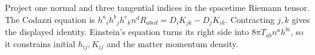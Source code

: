 \begin{enumerate}[leftmargin=2.8em,itemsep=1.2em]
Project one normal and three tangential indices in the spacetime Riemann
tensor.  The Codazzi equation is
\(h^a{}_ih^b{}_jh^c{}_kn^dR_{abcd}=D_iK_{jk}-D_jK_{ik}\).
Contracting \(j,k\) gives the displayed identity.  Einstein's equation turns
its right side into \(8\pi T_{ab}n^ah^{bi}\), so it constrains initial
\(h_{ij},K_{ij}\) and the matter momentum density.
\end{enumerate}
